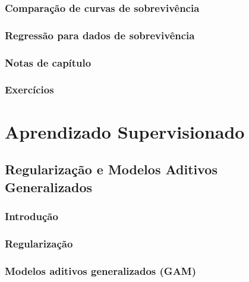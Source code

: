 \documentclass[
]{latex/krantz}
\theoremstyle{definition}
\theoremstyle{definition}
\theoremstyle{definition}
\theoremstyle{definition}
\theoremstyle{remark}
\begin{document}
\hypertarget{comparauxe7uxe3o-de-curvas-de-sobrevivuxeancia}{%
\section{Comparação de curvas de sobrevivência}\label{comparauxe7uxe3o-de-curvas-de-sobrevivuxeancia}}

\hypertarget{regressuxe3o-para-dados-de-sobrevivuxeancia}{%
\section{Regressão para dados de sobrevivência}\label{regressuxe3o-para-dados-de-sobrevivuxeancia}}

\hypertarget{notas-de-capuxedtulo-5}{%
\section{Notas de capítulo}\label{notas-de-capuxedtulo-5}}

\hypertarget{exercuxedcios-5}{%
\section{Exercícios}\label{exercuxedcios-5}}

\hypertarget{part-aprendizado-supervisionado}{%
\part{Aprendizado Supervisionado}\label{part-aprendizado-supervisionado}}

\hypertarget{regularizauxe7uxe3o-e-modelos-aditivos-generalizados}{%
\chapter{Regularização e Modelos Aditivos Generalizados}\label{regularizauxe7uxe3o-e-modelos-aditivos-generalizados}}

\hypertarget{introduuxe7uxe3o-6}{%
\section{Introdução}\label{introduuxe7uxe3o-6}}

\hypertarget{regularizauxe7uxe3o}{%
\section{Regularização}\label{regularizauxe7uxe3o}}

\hypertarget{modelos-aditivos-generalizados-gam}{%
\section{Modelos aditivos generalizados (GAM)}\label{modelos-aditivos-generalizados-gam}}
\end{document}
